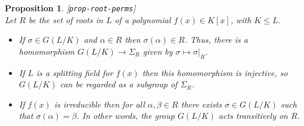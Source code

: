 \documentclass{amsart}
\newcommand{\lbl}[1]{\label{#1}\textup{[\texttt{#1}]}\ \\}
\newcommand{\lbl}{\label}
\newcommand{\al}        {\alpha}
\newcommand{\bt}        {\beta}
\newcommand{\sg}        {\sigma}
\newcommand{\Sg}        {\Sigma}
\renewcommand{\:}{\colon}
\newtheorem{proposition}[theorem]{Proposition}
\theoremstyle{definition}
\begin{document}
\begin{proposition}\lbl{prop-root-perms}
 Let $R$ be the set of roots in $L$ of a polynomial $f(x)\in K[x]$,
 with $K\leq L$.
 \begin{itemize}
  \item[(a)] If $\sg\in G(L/K)$ and $\al\in R$ then $\sg(\al)\in R$.
   Thus, there is a homomorphism $G(L/K)\to\Sg_R$ given by
   $\sg\mapsto\sg|_R$.
  \item[(b)] If $L$ is a splitting field for $f(x)$ then this
   homomorphism is injective, so $G(L/K)$ can be regarded as a
   subgroup of $\Sg_R$.
  \item[(c)] If $f(x)$ is irreducible then for all $\al,\bt\in R$
   there exists $\sg\in G(L/K)$ such that $\sg(\al)=\bt$.  In other
   words, the group $G(L/K)$ acts transitively on $R$.
 \end{itemize}
\end{proposition}
\end{document}
